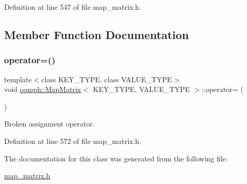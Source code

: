 Definition at line 547 of file map\+\_\+matrix.\+h.



\subsection{Member Function Documentation}
\mbox{\label{classoomph_1_1MapMatrix_ad28a61f99589c46468dada134650857d}} 
\subsubsection{\texorpdfstring{operator=()}{operator=()}}
{\footnotesize\ttfamily template$<$class K\+E\+Y\+\_\+\+T\+Y\+PE, class V\+A\+L\+U\+E\+\_\+\+T\+Y\+PE$>$ \\
void \hyperlink{classoomph_1_1MapMatrix}{oomph\+::\+Map\+Matrix}$<$ K\+E\+Y\+\_\+\+T\+Y\+PE, V\+A\+L\+U\+E\+\_\+\+T\+Y\+PE $>$\+::operator= (\begin{DoxyParamCaption}\item[{const \hyperlink{classoomph_1_1MapMatrix}{Map\+Matrix}$<$ K\+E\+Y\+\_\+\+T\+Y\+PE, V\+A\+L\+U\+E\+\_\+\+T\+Y\+PE $>$ \&}]{ }\end{DoxyParamCaption})\hspace{0.3cm}{\ttfamily [inline]}}



Broken assignment operator. 



Definition at line 572 of file map\+\_\+matrix.\+h.



The documentation for this class was generated from the following file\+:\begin{DoxyCompactItemize}
\item 
\hyperlink{map__matrix_8h}{map\+\_\+matrix.\+h}\end{DoxyCompactItemize}
